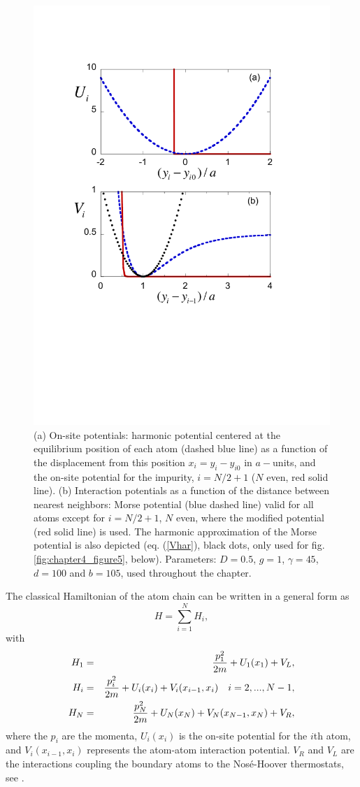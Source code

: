 \begin{figure}
\centering
\includegraphics[width=0.65\linewidth]{Figures/FIG1.pdf}
\caption{(a) On-site potentials: harmonic potential centered at the equilibrium position of each atom (dashed blue line) as a function of the displacement from this position $x_i=y_i-y_{i0}$ in $a-$units, and the on-site potential for the impurity, $i=N/2+1$
($N$ even, red solid line). (b) Interaction potentials as a function of the distance between nearest neighbors: Morse potential
(blue dashed line) valid for all atoms except for $i=N/2+1$, $N$ even, where the modified potential (red solid line) is used.
The harmonic approximation of the Morse potential is also depicted (eq. (\ref{Vhar}), black dots, only used for fig. \ref{fig:chapter4_figure5}, below).
Parameters: $D=0.5$, $g=1$, $\gamma = 45$, $d=100$ and $b=105$, used throughout the chapter.
}
\label{fig:chapter4_figure1}
\end{figure}

The classical Hamiltonian of the atom chain can be written in a general form as
%
\begin{equation}
\label{GH}
H=\sum_{i=1}^{N} H_i,
\end{equation}
%
with
%
\begin{eqnarray}
\label{GH2}
H_1&=&{{p^2_1} \over {2m}} +U_1(x_1)+V_L,
\nonumber\\
H_i&=&{{p^2_i} \over {2m}} +U_i(x_i)+V_i(x_{i-1},x_i)  \quad i=2,...,N-1,
 \nonumber\\
H_N&=&{{p^2_N} \over {2m}} +U_N(x_N)+V_N(x_{N-1},x_N) + V_R,
\end{eqnarray}
%
where the $p_i$ are the momenta, $U_i(x_i)$ is the on-site potential for the $i$th atom, and $V_i(x_{i-1},x_i)$ represents the atom-atom interaction potential. $V_R$ and $V_L$ are the interactions coupling the boundary atoms to the Nos\'e-Hoover thermostats, see \cite{Martyna1992}.


